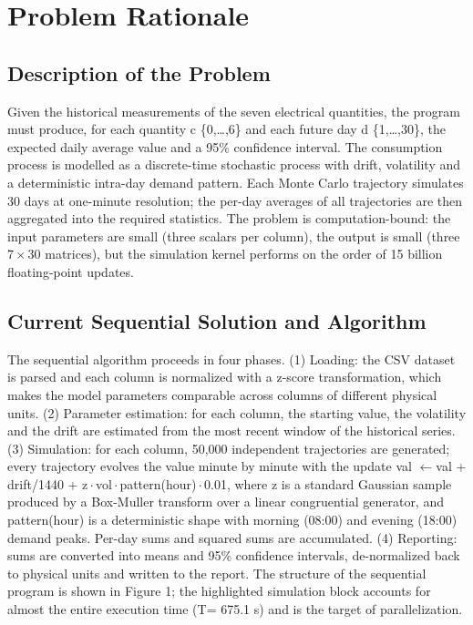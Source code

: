 \documentclass[12pt,a4paper]{article}
\begin{document}
\section{Problem Rationale}

\subsection{Description of the Problem}

Given the historical measurements of the seven electrical quantities,
the program must produce, for each quantity c \{0,\ldots,6\} and each
future day d \{1,\ldots,30\}, the expected daily average value and a
95\% confidence interval. The consumption process is modelled as a
discrete-time stochastic process with drift, volatility and a
deterministic intra-day demand pattern. Each Monte Carlo trajectory
simulates 30 days at one-minute resolution; the per-day averages of all
trajectories are then aggregated into the required statistics. The
problem is computation-bound: the input parameters are small (three scalars per column), the output is
small (three $7\times30$ matrices), but the simulation kernel performs on the
order of 15 billion floating-point updates.

\subsection{Current Sequential Solution and Algorithm}

The sequential algorithm proceeds in four phases. (1) Loading: the CSV
dataset is parsed and each column is normalized with a z-score
transformation, which makes the model parameters comparable across
columns of different physical units. (2) Parameter estimation: for each
column, the starting value, the volatility and the drift are estimated
from the most recent window of the historical series. (3) Simulation:
for each column, 50,000 independent trajectories are generated; every
trajectory evolves the value minute by minute with the update val $\leftarrow$val +
drift/1440 + z\,$\cdot$\,vol\,$\cdot$\,pattern(hour)\,$\cdot$\,0.01, where z is a standard
Gaussian sample produced by a Box-Muller transform over a linear
congruential generator, and pattern(hour) is a deterministic shape with
morning (08:00) and evening (18:00) demand peaks. Per-day sums and
squared sums are accumulated. (4) Reporting: sums are converted into
means and 95\% confidence intervals, de-normalized back to physical
units and written to the report. The structure of the sequential program
is shown in Figure 1; the highlighted simulation block accounts for
almost the entire execution time (T= 675.1 s) and is the target of
parallelization.
\end{document}
